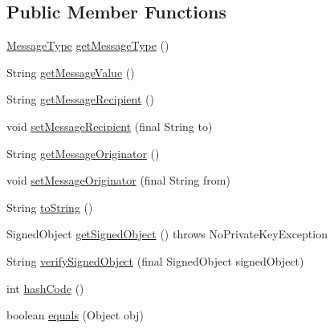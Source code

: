 \subsection*{Public Member Functions}
\begin{DoxyCompactItemize}
\item 
\hyperlink{enumgov_1_1fnal_1_1ppd_1_1dd_1_1chat_1_1MessageType}{Message\-Type} \hyperlink{classgov_1_1fnal_1_1ppd_1_1dd_1_1chat_1_1MessageCarrier_acd6dda2603952e714aca5678f7758fe1}{get\-Message\-Type} ()
\item 
String \hyperlink{classgov_1_1fnal_1_1ppd_1_1dd_1_1chat_1_1MessageCarrier_a040740dc58eabbc8c55b4e129e6abd1a}{get\-Message\-Value} ()
\item 
String \hyperlink{classgov_1_1fnal_1_1ppd_1_1dd_1_1chat_1_1MessageCarrier_a6fe680384a1b50d5499f666253e88fc2}{get\-Message\-Recipient} ()
\item 
void \hyperlink{classgov_1_1fnal_1_1ppd_1_1dd_1_1chat_1_1MessageCarrier_a72cf47448f7e9a741d8eaff765b8534f}{set\-Message\-Recipient} (final String to)
\item 
String \hyperlink{classgov_1_1fnal_1_1ppd_1_1dd_1_1chat_1_1MessageCarrier_a03209614a5ba67f403b24b7b642b0acb}{get\-Message\-Originator} ()
\item 
void \hyperlink{classgov_1_1fnal_1_1ppd_1_1dd_1_1chat_1_1MessageCarrier_a594aad4d369789156b8f4875b81da234}{set\-Message\-Originator} (final String from)
\item 
String \hyperlink{classgov_1_1fnal_1_1ppd_1_1dd_1_1chat_1_1MessageCarrier_aae023e6861947c5ef768ceb040b01b6d}{to\-String} ()
\item 
Signed\-Object \hyperlink{classgov_1_1fnal_1_1ppd_1_1dd_1_1chat_1_1MessageCarrier_aa9e27300a13c639253bf5955d6062495}{get\-Signed\-Object} ()  throws No\-Private\-Key\-Exception 
\item 
String \hyperlink{classgov_1_1fnal_1_1ppd_1_1dd_1_1chat_1_1MessageCarrier_a2ce4e682637b506575889db4917a379f}{verify\-Signed\-Object} (final Signed\-Object signed\-Object)
\item 
int \hyperlink{classgov_1_1fnal_1_1ppd_1_1dd_1_1chat_1_1MessageCarrier_a2ef587730f13d97fc9bcf57a371f9543}{hash\-Code} ()
\item 
boolean \hyperlink{classgov_1_1fnal_1_1ppd_1_1dd_1_1chat_1_1MessageCarrier_a43e9cdeae36815d03d8ccd528171a6d9}{equals} (Object obj)
\end{DoxyCompactItemize}
